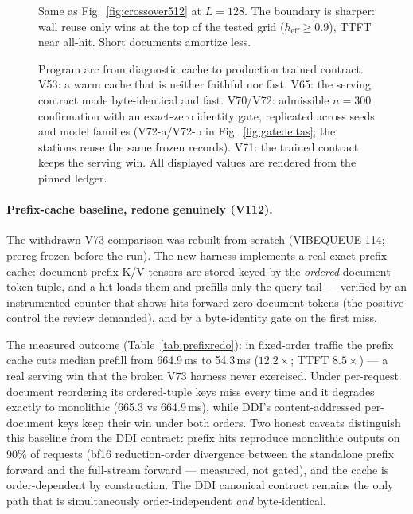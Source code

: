 \begin{figure}[H]
\centering

\caption{Same as Fig.~\ref{fig:crossover512} at $L{=}128$. The boundary is
sharper: wall reuse only wins at the top of the tested grid
($h_{\mathrm{eff}}\geq 0.9$), TTFT near all-hit. Short documents amortize
less.}
\label{fig:crossover128}
\end{figure}

\begin{figure}[H]
\centering

\caption{Program arc from diagnostic cache to production trained
contract. V53: a warm cache that is neither faithful nor fast. V65: the
serving contract made byte-identical and fast. V70/V72: admissible
$n{=}300$ confirmation with an exact-zero identity gate, replicated across
seeds and model families (V72-a/V72-b in Fig.~\ref{fig:gatedeltas}; the
stations reuse the same frozen records). V71: the trained contract keeps
the serving win. All displayed values are rendered from the pinned ledger.}
\label{fig:timeline}
\end{figure}

\paragraph{Prefix-cache baseline, redone genuinely (V112).}
The withdrawn V73 comparison was rebuilt from scratch
(VIBEQUEUE-114; prereg frozen before the run). The new harness implements a
real exact-prefix cache: document-prefix K/V tensors are stored keyed by the
\emph{ordered} document token tuple, and a hit loads them and prefills only
the query tail --- verified by an instrumented counter that shows hits
forward zero document tokens (the positive control the review demanded),
and by a byte-identity gate on the first miss.

\begin{table}[H]
\centering\footnotesize
\caption{Prefix-cache redo (V112): fixed-order traffic, reordered traffic,
and the DDI canonical cache on the same requests.}
\label{tab:prefixredo}
\end{table}

The measured outcome (Table~\ref{tab:prefixredo}): in fixed-order traffic
the prefix cache cuts median prefill from 664.9\,ms to 54.3\,ms
($12.2\times$; TTFT $8.5\times$) --- a real serving win that the broken V73
harness never exercised. Under per-request document reordering its
ordered-tuple keys miss every time and it degrades exactly to monolithic
(665.3 vs 664.9\,ms), while DDI's content-addressed per-document keys keep
their win under both orders. Two honest caveats distinguish this baseline
from the DDI contract: prefix hits reproduce monolithic outputs on 90\% of
requests (bf16 reduction-order divergence between the standalone prefix
forward and the full-stream forward --- measured, not gated), and the cache
is order-dependent by construction. The DDI canonical contract remains the
only path that is simultaneously order-independent \emph{and}
byte-identical.

